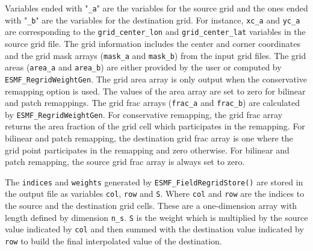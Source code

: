 Variables ended with "{\tt \_a}" are the variables for the source grid and the ones ended with "{\tt \_b}"
are the variables for the destination grid. For instance, {\tt xc\_a} and {\tt yc\_a} are corresponding
to the {\tt grid\_center\_lon} and {\tt grid\_center\_lat} variables in the source grid file.
The grid information includes the center and corner coordinates and the grid mask
arrays ({\tt mask\_a} and {\tt mask\_b}) from the input grid files.
The grid areas ({\tt area\_a} and {\tt area\_b}) are either provided by the user or computed by
{\tt ESMF\_RegridWeightGen}. The grid area array is only output when the conservative remapping
option is used. The values of the area array are set to zero for bilinear and patch remappings.
The grid frac arrays ({\tt frac\_a} and {\tt frac\_b}) are calculated by {\tt ESMF\_RegridWeightGen}.
For conservative remapping, the grid frac array
returns the area fraction of the grid cell which participates in the remapping.
For bilinear and patch remapping, the
destination grid frac array is one where the grid point participates in the remapping
and zero otherwise. For bilinear and patch remapping, the source grid frac array
is always set to zero.

The {\tt indices} and {\tt weights} generated by {\tt ESMF\_FieldRegridStore()} are stored in the output
file as variables {\tt col}, {\tt row} and {\tt S}. Where {\tt col} and {\tt row} are the indices to the
source and the destination grid cells.  These are a one-dimension array with length defined by dimension
{\tt n\_s}. {\tt S} is the weight which is multiplied by the source value indicated by {\tt col} and then
summed with the destination value indicated by {\tt row} to build the final interpolated value of the
destination.

